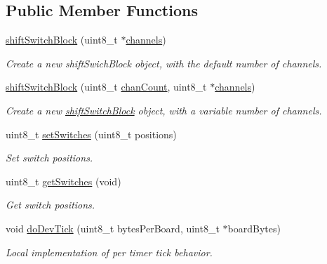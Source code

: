 \subsection*{Public Member Functions}
\begin{DoxyCompactItemize}
\item 
\hyperlink{classshift_switch_block_acb483c64b961341ff6065b25ea2c4368}{shiftSwitchBlock} (uint8\_\-t $\ast$\hyperlink{classshift_device_ac63a0543346c357134fd207a47976bab}{channels})
\begin{DoxyCompactList}\small\item\em Create a new shiftSwichBlock object, with the default number of channels. \item\end{DoxyCompactList}\item 
\hyperlink{classshift_switch_block_ad6e23569570f9f6c37e7dc6e0b360b73}{shiftSwitchBlock} (uint8\_\-t \hyperlink{classshift_device_a8eed8391ef608036d0f55f42348c0e41}{chanCount}, uint8\_\-t $\ast$\hyperlink{classshift_device_ac63a0543346c357134fd207a47976bab}{channels})
\begin{DoxyCompactList}\small\item\em Create a new \hyperlink{classshift_switch_block}{shiftSwitchBlock} object, with a variable number of channels. \item\end{DoxyCompactList}\item 
uint8\_\-t \hyperlink{classshift_switch_block_abc0f22095833ef9f9d84ae8b29934357}{setSwitches} (uint8\_\-t positions)
\begin{DoxyCompactList}\small\item\em Set switch positions. \item\end{DoxyCompactList}\item 
uint8\_\-t \hyperlink{classshift_switch_block_a292a158fc742c52f2227728c024e9e70}{getSwitches} (void)
\begin{DoxyCompactList}\small\item\em Get switch positions. \item\end{DoxyCompactList}\item 
void \hyperlink{classshift_switch_block_ab6bbc5883fc7d966103df29d40ae012e}{doDevTick} (uint8\_\-t bytesPerBoard, uint8\_\-t $\ast$boardBytes)
\begin{DoxyCompactList}\small\item\em Local implementation of per timer tick behavior. \item\end{DoxyCompactList}\end{DoxyCompactItemize}


